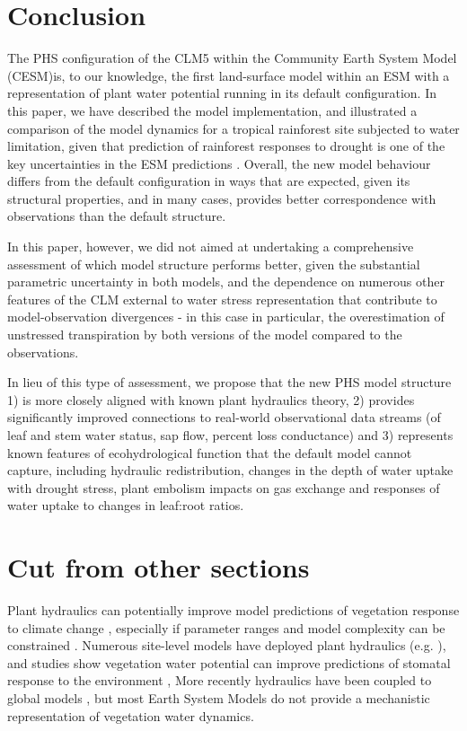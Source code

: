\documentclass[draft,linenumbers]{agujournal}
\begin{document}
\section{Conclusion}

    The PHS configuration of the CLM5 within the Community Earth System Model (CESM)is, to our knowledge, the first land-surface model within an ESM with a representation of plant water potential running in its default configuration. In this paper, we have described the model implementation, and illustrated a comparison of the model dynamics for a tropical rainforest site subjected to water limitation, given that prediction of rainforest responses to drought is one of the key uncertainties in the ESM predictions \citep{huntingford2013}. Overall, the new model behaviour differs from the default configuration in ways that are expected, given its structural properties, and in many cases, provides better correspondence with observations than the default structure. 
    
    In this paper, however, we did not aimed at undertaking a comprehensive assessment of which model structure performs better, given the substantial parametric uncertainty in both models, and the dependence on numerous other features of the CLM external to water stress representation that contribute to model-observation divergences - in this case in particular, the overestimation of unstressed transpiration by both versions of the model compared to the observations. 
    
    In lieu of this type of assessment, we propose that the new PHS model structure 1) is more closely aligned with known plant hydraulics theory, 2) provides significantly improved connections to real-world observational data streams (of leaf and stem water status, sap flow, percent loss conductance) and 3) represents known features of ecohydrological function that the default model cannot capture, including hydraulic redistribution, changes in the depth of water uptake with drought stress, plant embolism impacts on gas exchange and responses of water uptake to changes in leaf:root ratios. 
    
\section{Cut from other sections}

    Plant hydraulics can potentially improve model predictions of vegetation response to climate change \citep{sperry2015}, 
    especially if parameter ranges and model complexity can be constrained \citep{rogers2017}.
    Numerous site-level models have deployed plant hydraulics (e.g. \citet{williams1996,sperry1998,bohrer2005}), and studies show
    vegetation water potential can improve predictions of stomatal response to the environment \citep{sperry2017,anderegg2017},
    More recently hydraulics have been coupled to global models \citep{bonan2014,xu2016,christoffersen2016}, 
    but most Earth System Models do not provide a mechanistic representation of vegetation water dynamics.
    
\end{document}
